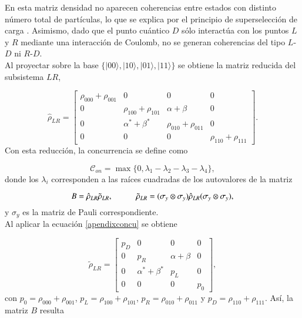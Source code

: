 \begin{appendixs}
En esta matriz densidad no aparecen coherencias entre estados con distinto número total de partículas, lo que se explica por el principio de superselección de carga \cite{bartlett2007reference,wick1997intrinsic}. Asimismo, dado que el punto cuántico $D$ sólo interactúa con los puntos $L$ y $R$ mediante una interacción de Coulomb, no se generan coherencias del tipo $L$-$D$ ni $R$-$D$. 
\\

Al proyectar sobre la base $\{|00\rangle, |10\rangle, |01\rangle, |11\rangle\}$ se obtiene la matriz reducida del subsistema $LR$,

\begin{equation*}
    \hat{\rho}_{LR} = 
    \begin{bmatrix}
        \rho_{000}+\rho_{001} & 0 & 0 & 0  \\
        0 & \rho_{100} + \rho_{101} & \alpha + \beta & 0  \\
        0 & \alpha^{*} + \beta^{*} & \rho_{010} + \rho_{011} & 0  \\
        0 & 0 & 0 & \rho_{110} + \rho_{111} 
        \end{bmatrix}.
\end{equation*}
Con esta reducción, la concurrencia se define como

\begin{equation*}
    \mathcal{C}_{on} = \max \{ 0,\lambda_{1} - \lambda_{2} - \lambda_{3} - \lambda_{4} \},
\end{equation*}
donde los $\lambda_{i}$ corresponden a las raíces cuadradas de los autovalores de la matriz

\begin{equation}
    B = \hat{\rho}_{LR} \tilde{\rho}_{LR}, 
    \hspace{10mm} 
    \tilde{\rho}_{LR} = (\sigma_{y} \otimes \sigma_{y}) \hat{\rho}_{LR} (\sigma_{y} \otimes \sigma_{y}),
    \label{apendixconcu}
\end{equation}
y $\sigma_{y}$ es la matriz de Pauli correspondiente.  
\\

Al aplicar la ecuación \eqref{apendixconcu} se obtiene

\begin{equation*}
    \tilde{\rho}_{LR} = 
    \begin{bmatrix}
        p_{D} & 0 & 0 & 0  \\
        0 & p_{R} & \alpha + \beta & 0  \\
        0 & \alpha^{*} + \beta^{*} & p_{L} & 0  \\
        0 & 0 & 0 & p_{0} 
        \end{bmatrix},
\end{equation*}
con  $p_{0}=\rho_{000}+\rho_{001}$, $p_{L}=\rho_{100} + \rho_{101}$, $p_{R}=\rho_{010}+\rho_{011}$ y $p_{D}=\rho_{110}+\rho_{111}$. Así, la matriz $B$ resulta


\end{appendixs}
